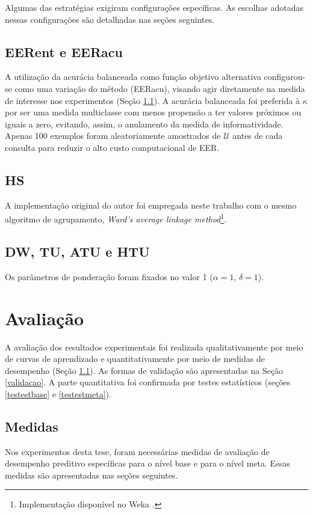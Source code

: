 Algumas das estratégias exigiram configurações específicas.
As escolhas adotadas nessas configurações são detalhadas nas seções seguintes.

\subsection{EERent e EERacu} \label{eerconfig}
A utilização da acurácia balanceada \cite{journals/bmcbi/MassoV10} como função objetivo alternativa configurou-se como uma variação do método (EERacu), visando agir diretamente na medida de interesse nos experimentos (Seção \ref{medidas}).
A acurácia balanceada foi preferida à $\kappa$ por ser uma medida multiclasse com menos propensão a ter valores próximos ou iguais a zero, evitando, assim, o anulamento da medida de informatividade.
Apenas 100 exemplos foram aleatoriamente amostrados de $\mathcal{U}$ antes de cada consulta para reduzir o alto custo computacional de EER.

\subsection{HS}\label{metohs}
A implementação original do autor foi empregada neste trabalho com o mesmo
algoritmo de agrupamento, 
\textit{Ward's average linkage method}\footnote{
Implementação disponível no Weka \cite{journals/sigkdd/HallFHPRW09}.}.

\subsection{DW, TU, ATU e HTU}
Os parâmetros de ponderação foram fixados no valor 1 ($\alpha=1$, $\delta=1$).

\section{Avaliação}\label{avaliacao}
A avaliação dos resultados experimentais foi realizada qualitativamente por meio de curvas de aprendizado e quantitativamente por meio de medidas de desempenho (Seção \ref{medidas}).
As formas de validação são apresentadas na Seção \ref{validacao}.
A parte quantitativa foi confirmada por testes estatísticos (seções \ref{testestbase} e \ref{testestmeta}). 

\subsection{Medidas}\label{medidas}
Nos experimentos desta tese, foram necessárias medidas de avaliação de desempenho preditivo específicas para o nível base e para o nível meta.
Essas medidas são apresentadas nas seções seguintes.

